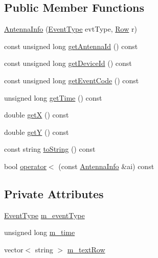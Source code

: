 \subsection*{Public Member Functions}
\begin{DoxyCompactItemize}
\item 
\hyperlink{class_antenna_info_a4cbcbed39618d71c76ab72b777b4d849}{Antenna\+Info} (\hyperlink{_event_type_8h_a2628ea8d12e8b2563c32f05dc7fff6fa}{Event\+Type} evt\+Type, \hyperlink{class_row}{Row} r)
\item 
const unsigned long \hyperlink{class_antenna_info_a551235c9dca1231beedda388a36280a5}{get\+Antenna\+Id} () const
\item 
const unsigned long \hyperlink{class_antenna_info_ae59a012bda35bb1ccfe1ff2c4038ac18}{get\+Device\+Id} () const
\item 
const unsigned long \hyperlink{class_antenna_info_a300f601af4e815890b385e661f43c335}{get\+Event\+Code} () const
\item 
unsigned long \hyperlink{class_antenna_info_aaae1e1105ba4a724c0061e3f7904b1e5}{get\+Time} () const
\item 
double \hyperlink{class_antenna_info_a3817cba0231888dc5977105ace0faddb}{getX} () const
\item 
double \hyperlink{class_antenna_info_aa385e3e85d783b81d69014a64b5fc94f}{getY} () const
\item 
const string \hyperlink{class_antenna_info_ae1ba7432ca7aef9a4f79a422ee195a58}{to\+String} () const
\item 
bool \hyperlink{class_antenna_info_a74156652eb5ad9a62f41fea726e33b40}{operator$<$} (const \hyperlink{class_antenna_info}{Antenna\+Info} \&ai) const
\end{DoxyCompactItemize}
\subsection*{Private Attributes}
\begin{DoxyCompactItemize}
\item 
\hyperlink{_event_type_8h_a2628ea8d12e8b2563c32f05dc7fff6fa}{Event\+Type} \hyperlink{class_antenna_info_aae043083f5d58b4d7264be468b45541a}{m\+\_\+event\+Type}
\item 
unsigned long \hyperlink{class_antenna_info_a355d929c83040e154f635ce149286b05}{m\+\_\+time}
\item 
vector$<$ string $>$ \hyperlink{class_antenna_info_a46f54626284418436f65f03718e8d38e}{m\+\_\+text\+Row}
\end{DoxyCompactItemize}



